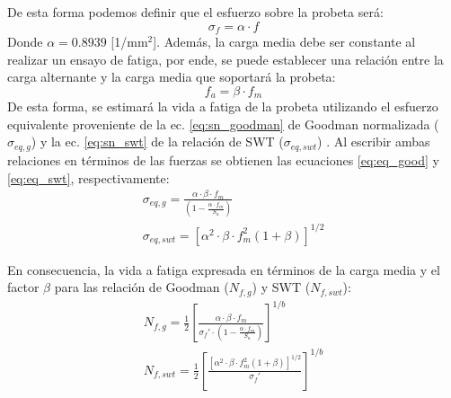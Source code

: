 De esta forma podemos definir que el esfuerzo sobre la probeta será:
\begin{equation}
	\sigma_f = \alpha \cdot f
\end{equation}
Donde $\alpha = 0.8939$ [1/mm$^2$]. Además, la carga media debe ser constante al realizar un ensayo de fatiga, por ende, se puede establecer una relación entre la carga alternante y la carga media que soportará la probeta:
\begin{equation} \label{eq:fa_bfm}
	f_a = \beta \cdot f_m
\end{equation}
De esta forma, se estimará la vida a fatiga de la probeta utilizando el esfuerzo equivalente proveniente de la ec. \ref{eq:sn_goodman} de Goodman normalizada ($\sigma_{eq,g}$) y la ec. \ref{eq:sn_swt} de la relación de SWT ($\sigma_{eq,swt}$) . Al escribir ambas relaciones en términos de las fuerzas se obtienen las ecuaciones \ref{eq:eq_good} y \ref{eq:eq_swt}, respectivamente:
\begin{subequations}
\begin{gather}
	\sigma_{eq,g} = \frac{\alpha \cdot \beta \cdot f_m}{\left(1 - \frac{\alpha \cdot f_m}{S_u}\right)} \label{eq:eq_good} \\[10pt]
	\sigma_{eq,swt} = \left[ \alpha^2 \cdot \beta \cdot f_m^2 (1 + \beta)\right]^{1/2} \label{eq:eq_swt}
\end{gather}
\end{subequations}

%
 
En consecuencia, la vida a fatiga expresada en términos de la carga media y el factor $\beta$ para las relación de Goodman ($N_{f,g}$) y SWT ($N_{f,swt}$):
\begin{subequations}
\begin{gather}
	N_{f,g} = \frac{1}{2} \left[\frac{\alpha \cdot \beta \cdot f_m}{\sigma_f' \cdot \left(1 - \frac{\alpha \cdot f_m}{S_u}\right)}\right]^{1/b} \\[10pt]
	N_{f,swt} = \frac{1}{2}\left[\frac{\left[ \alpha^2 \cdot \beta \cdot f_m^2 (1 + \beta)\right]^{1/2}}{\sigma_f'}\right]^{1/b}
\end{gather}
\end{subequations}

